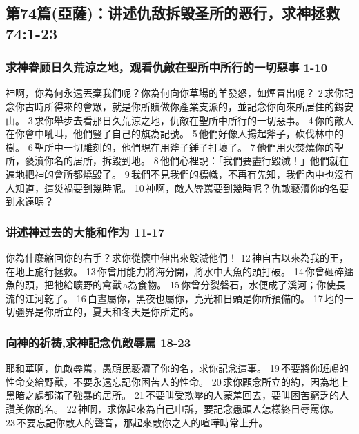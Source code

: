\subsection{第74篇(亞薩)：讲述仇敌拆毁圣所的恶行，求神拯救  74:1-23}
\subsubsection{求神眷顾日久荒涼之地，观看仇敵在聖所中所行的一切惡事 1-10}
神啊，你為何永遠丟棄我們呢？你為何向你草場的羊發怒，如煙冒出呢？
2 求你記念你古時所得來的會眾，就是你所贖做你產業支派的，並記念你向來所居住的錫安山。
3 求你舉步去看那日久荒涼之地，仇敵在聖所中所行的一切惡事。
4 你的敵人在你會中吼叫，他們豎了自己的旗為記號。
5 他們好像人揚起斧子，砍伐林中的樹。
6 聖所中一切雕刻的，他們現在用斧子錘子打壞了。
7 他們用火焚燒你的聖所，褻瀆你名的居所，拆毀到地。
8 他們心裡說：「我們要盡行毀滅！」他們就在遍地把神的會所都燒毀了。
9 我們不見我們的標幟，不再有先知，我們內中也沒有人知道，這災禍要到幾時呢。
10 神啊，敵人辱罵要到幾時呢？仇敵褻瀆你的名要到永遠嗎？
\subsubsection{讲述神过去的大能和作为  11-17}
你為什麼縮回你的右手？求你從懷中伸出來毀滅他們！
12 神自古以來為我的王，在地上施行拯救。
13 你曾用能力將海分開，將水中大魚的頭打破。
14 你曾砸碎鱷魚的頭，把牠給曠野的禽獸 a為食物。
15 你曾分裂磐石，水便成了溪河；你使長流的江河乾了。
16 白晝屬你，黑夜也屬你，亮光和日頭是你所預備的。
17 地的一切疆界是你所立的，夏天和冬天是你所定的。
\subsubsection{向神的祈祷,求神記念仇敵辱罵  18-23}
耶和華啊，仇敵辱罵，愚頑民褻瀆了你的名，求你記念這事。
19 不要將你斑鳩的性命交給野獸，不要永遠忘記你困苦人的性命。
20 求你顧念所立的約，因為地上黑暗之處都滿了強暴的居所。
21 不要叫受欺壓的人蒙羞回去，要叫困苦窮乏的人讚美你的名。
22 神啊，求你起來為自己申訴，要記念愚頑人怎樣終日辱罵你。
23 不要忘記你敵人的聲音，那起來敵你之人的喧嘩時常上升。


